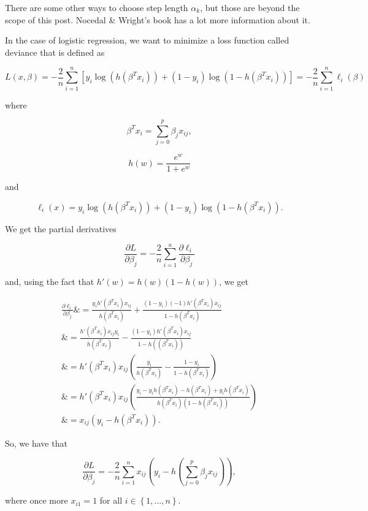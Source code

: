 There are some other ways to choose step length $\alpha_k$, but those are beyond the scope of this post. Nocedal \& Wright's book has a lot more information about it.


In the case of logistic regression, we want to minimize a loss function called deviance that is defined as

$$
L(x, \beta) = - \frac{2}{n} \sum_{i=1}^{n} \left[ y_i \log(h(\beta^T x_i)) + (1-y_i) \log(1-h(\beta^T x_i)) \right] = 
- \frac{2}{n} \sum_{i=1}^{n}{\ell_i(\beta)}
$$

where

$$
\beta^T x_i = \sum_{j=0}^{p}{\beta_j x_{ij}},
$$ 

$$
h(w) = \frac{e^w}{1+e^w}
$$ 

and 

$$
\ell_i(x) = y_i \log(h(\beta^T x_i)) + (1-y_i) \log(1-h(\beta^T x_i)).
$$

We get the partial derivatives

$$
\frac{\partial L}{\partial \beta_j} = -\frac{2}{n} \sum_{i = 1}^n { \frac{\partial \ell_i}{\partial \beta_j} }
$$

and, using the fact that $h'(w) = h(w)(1-h(w))$, we get

\begin{equation}
\begin{split}
\frac{\partial \ell_i}{\partial \beta_j} \& = 
\frac{y_i h'(\beta^T x_i) x_{ij} }  {h(\beta^T x_i)} + \frac{(1 - y_i) (-1) h'(\beta^T x_i) x_{ij}} {1 - h(\beta^T x_i)} \\
\& = \frac{h'(\beta^T x_i) x_{ij} y_i}{h(\beta^T x_i)} - \frac{(1 - y_i) h'(\beta^T x_i) x_{ij}}{1 - h((\beta^T x_i))} \\
\& = h'(\beta^T x_i) x_{ij} \left(\frac{y_i}{h(\beta^T x_i)} - \frac{1-y_i}{1-h(\beta^T x_i)} \right) \\
\& = h'(\beta^T x_i) x_{ij} \left(\frac{y_i - y_i h(\beta^T x_i) - 
h(\beta^T x_i) + y_i h(\beta^T x_i)}{h(\beta^T x_i)(1-h(\beta^T x_i))} \right) \\
\& = x_{ij}(y_i - h(\beta^T x_i)).
\end{split}
\end{equation}

So, we have that

$$
\frac{\partial L}{\partial \beta_j} = -\frac{2}{n} \sum_{i = 1}^n { x_{ij}(y_i - h(\sum_{j=0}^{p}{\beta_j x_{ij}})) },
$$

where once more $x_{i1} = 1$ for all $i \in \left\{1, ..., n \right\}$.


